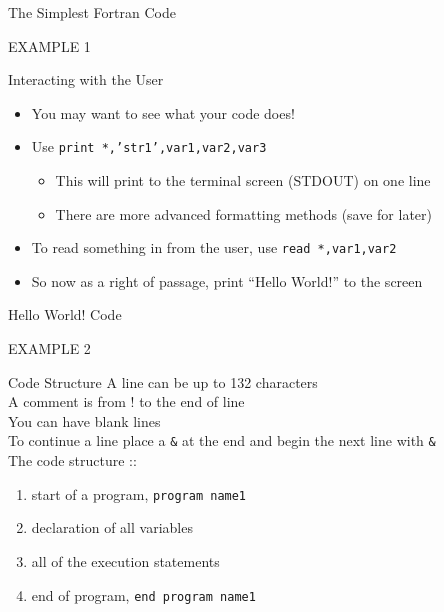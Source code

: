 \documentclass{beamer}
\begin{document}
\begin{frame}{The Simplest Fortran Code}
\vfill
\begin{center}
  \Huge{EXAMPLE 1}
\end{center}
\vfill
\end{frame}
\begin{frame}{Interacting with the User}
\begin{itemize}
  \item You may want to see what your code does!
  \vfill\item Use \texttt{print *,'str1',var1,var2,var3}
    \begin{itemize}
      \item This will print to the terminal screen (STDOUT) on one line 
      \item There are more advanced formatting methods (save for later)
    \end{itemize}
  \vfill\item To read something in from the user, use \texttt{read *,var1,var2}
  \vfill\item So now as a right of passage, print ``Hello World!'' to the screen
\end{itemize}
\end{frame}
\begin{frame}{Hello World! Code}
 \begin{center}
  \Huge{EXAMPLE 2}
\end{center}
\end{frame}
\begin{frame}{Code Structure}
A line can be up to 132 characters \\
A comment is from \alert{!} to the end of line  \\
You can have blank lines  \\
To continue a line place a \texttt{\&} at the end and begin the next line with \texttt{\&} \\
\vfill
The code structure ::
\begin{enumerate}
  \item start of a program, \texttt{program name1}
  \vfill\item declaration of all variables
  \vfill\item all of the execution statements
  \vfill\item end of program, \texttt{end program name1}
\end{enumerate}

\end{frame}
\end{document}
